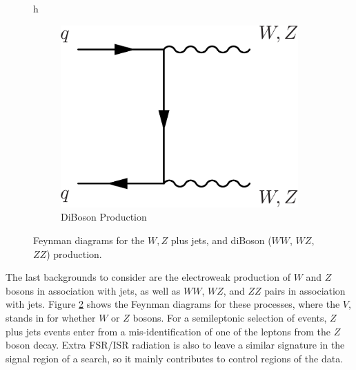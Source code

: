 \begin{figure}{h}
\begin{subfigure}[h]{0.3\textwidth}
        \includegraphics[width=\textwidth]{Figures/Feynman_Diagrams/backgrounds__VV.pdf}
        \caption{DiBoson Production}\label{fd:VV}
      \end{subfigure}
      \caption{Feynman diagrams for the $W,Z$ plus jets, and diBoson
        ($WW$, $WZ$, $ZZ$) production.} \label{fig:feynman_diagrams__Vjets__VV}
\end{figure}

\par The last backgrounds to consider are the electroweak production
of $W$ and $Z$ bosons in association with jets, as well as $WW$, $WZ$, and
$ZZ$ pairs in association with jets.  Figure
\ref{fig:feynman_diagrams__Vjets__VV} shows the Feynman diagrams for
these processes, where the $V$, stands in for whether $W$ or $Z$
bosons.  For a semileptonic selection of \ttH events, $Z$ plus jets
events enter from a mis-identification of one of the leptons from the
$Z$ boson decay.  Extra FSR/ISR radiation is also to leave a similar
signature in the signal region of a \ttH search, so it mainly
contributes to control regions of the data.  

